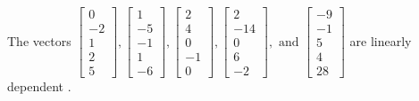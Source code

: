 \begin{exercise}
\begin{exerciseStatement}
  \end{exerciseStatement}
  \begin{exerciseAnswer}
   The vectors \(\left[\begin{array}{r}
0 \\
-2 \\
1 \\
2 \\
5
\end{array}\right] , \left[\begin{array}{r}
1 \\
-5 \\
-1 \\
1 \\
-6
\end{array}\right] , \left[\begin{array}{r}
2 \\
4 \\
0 \\
-1 \\
0
\end{array}\right] , \left[\begin{array}{r}
2 \\
-14 \\
0 \\
6 \\
-2
\end{array}\right] , \text{ and } \left[\begin{array}{r}
-9 \\
-1 \\
5 \\
4 \\
28
\end{array}\right]\) are 
  	 linearly dependent  .
  


  \end{exerciseAnswer}
\end{exercise}